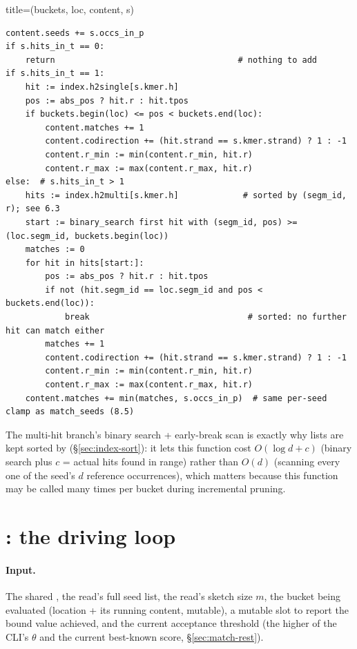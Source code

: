\begin{algobox}{title={(buckets, loc, content, s)}}
\begin{verbatim}
content.seeds += s.occs_in_p
if s.hits_in_t == 0:
    return                                     # nothing to add
if s.hits_in_t == 1:
    hit := index.h2single[s.kmer.h]
    pos := abs_pos ? hit.r : hit.tpos
    if buckets.begin(loc) <= pos < buckets.end(loc):
        content.matches += 1
        content.codirection += (hit.strand == s.kmer.strand) ? 1 : -1
        content.r_min := min(content.r_min, hit.r)
        content.r_max := max(content.r_max, hit.r)
else:  # s.hits_in_t > 1
    hits := index.h2multi[s.kmer.h]             # sorted by (segm_id, r); see 6.3
    start := binary_search first hit with (segm_id, pos) >= (loc.segm_id, buckets.begin(loc))
    matches := 0
    for hit in hits[start:]:
        pos := abs_pos ? hit.r : hit.tpos
        if not (hit.segm_id == loc.segm_id and pos < buckets.end(loc)):
            break                                # sorted: no further hit can match either
        matches += 1
        content.codirection += (hit.strand == s.kmer.strand) ? 1 : -1
        content.r_min := min(content.r_min, hit.r)
        content.r_max := max(content.r_max, hit.r)
    content.matches += min(matches, s.occs_in_p)  # same per-seed clamp as match_seeds (8.5)
\end{verbatim}
\end{algobox}

The multi-hit branch's binary search + early-break scan is exactly why  lists are
kept sorted by  (\S\ref{sec:index-sort}): it lets this function cost
$O(\log d + c)$ (binary search plus $c$ = actual hits found in range) rather than $O(d)$ (scanning
every one of the seed's $d$ reference occurrences), which matters because this function may be
called many times per bucket during incremental pruning.

\section{: the driving loop}
\label{sec:seed-heuristic-pass}

\paragraph{Input.} The shared , the read's full seed list, the read's sketch size
$m$, the bucket being evaluated (location + its running content, mutable), a mutable slot to
report the bound value achieved, and the current acceptance threshold  (the higher of
the CLI's $\theta$ and the current best-known score, \S\ref{sec:match-rest}).

